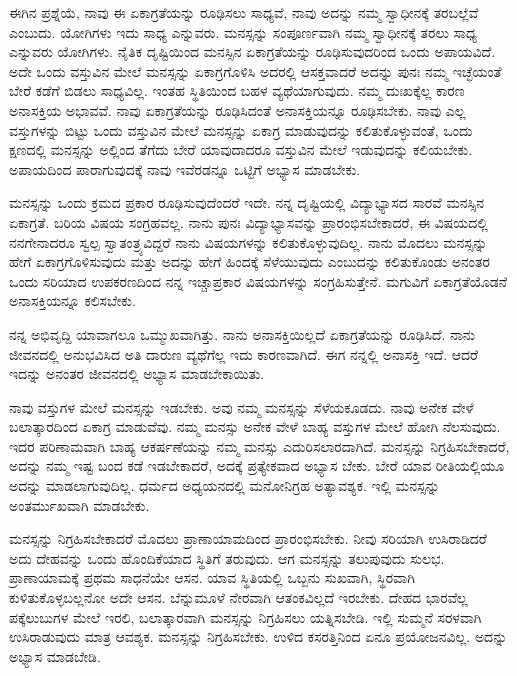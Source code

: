 ಈಗಿನ ಪ್ರಶ್ನೆಯೆ, ನಾವು ಈ ಏಕಾಗ್ರತೆಯನ್ನು ರೂಢಿಸಲು ಸಾಧ್ಯವೆ, ನಾವು ಅದನ್ನು ನಮ್ಮ ಸ್ವಾಧೀನಕ್ಕೆ ತರಬಲ್ಲೆವೆ ಎಂಬುದು. ಯೋಗಿಗಳು ಇದು ಸಾಧ್ಯ ಎನ್ನುವರು. ಮನಸ್ಸನ್ನು ಸಂಪೂರ್ಣವಾಗಿ ನಮ್ಮ ಸ್ವಾಧೀನಕ್ಕೆ ತರಲು ಸಾಧ್ಯ ಎನ್ನುವರು ಯೋಗಿಗಳು. ನೈತಿಕ ದೃಷ್ಟಿಯಿಂದ ಮನಸ್ಸಿನ ಏಕಾಗ್ರತೆಯನ್ನು ರೂಢಿಸುವುದರಿಂದ ಒಂದು ಅಪಾಯವಿದೆ. ಅದೇ ಒಂದು ವಸ್ತುವಿನ ಮೇಲೆ ಮನಸ್ಸನ್ನು ಏಕಾಗ್ರಗೊಳಿಸಿ ಅದರಲ್ಲಿ ಆಸಕ್ತವಾದರೆ ಅದನ್ನು ಪುನಃ ನಮ್ಮ ಇಚ್ಛೆಯಂತೆ ಬೇರೆ ಕಡೆಗೆ ಬಿಡಲು ಸಾಧ್ಯವಿಲ್ಲ. ಇಂತಹ ಸ್ಥಿತಿಯಿಂದ ಬಹಳ ವ್ಯಥೆಯಾಗುವುದು. ನಮ್ಮ ದುಃಖಕ್ಕೆಲ್ಲ ಕಾರಣ ಅನಾಸಕ್ತಿಯ ಅಭಾವವೆ. ನಾವು ಏಕಾಗ್ರತೆಯನ್ನು ರೂಢಿಸಿದಂತೆ ಅನಾಸಕ್ತಿಯನ್ನೂ ರೂಢಿಸಬೇಕು. ನಾವು ಎಲ್ಲ ವಸ್ತುಗಳನ್ನು ಬಿಟ್ಟು ಒಂದು ವಸ್ತುವಿನ ಮೇಲೆ ಮನಸ್ಸನ್ನು ಏಕಾಗ್ರ ಮಾಡುವುದನ್ನು ಕಲಿತುಕೊಳ್ಳುವಂತೆ, ಒಂದು ಕ್ಷಣದಲ್ಲಿ ಮನಸ್ಸನ್ನು ಅಲ್ಲಿಂದ ತೆಗೆದು ಬೇರೆ ಯಾವುದಾದರೂ ವಸ್ತುವಿನ ಮೇಲೆ ಇಡುವುದನ್ನು ಕಲಿಯಬೇಕು. ಅಪಾಯದಿಂದ ಪಾರಾಗುವುದಕ್ಕೆ ನಾವು ಇವೆರಡನ್ನೂ ಒಟ್ಟಿಗೆ ಅಭ್ಯಾಸ ಮಾಡಬೇಕು.

ಮನಸ್ಸನ್ನು ಒಂದು ಕ್ರಮದ ಪ್ರಕಾರ ರೂಢಿಸುವುದೆಂದರೆ ಇದೇ. ನನ್ನ ದೃಷ್ಟಿಯಲ್ಲಿ ವಿದ್ಯಾಭ್ಯಾಸದ ಸಾರವೆ ಮನಸ್ಸಿನ ಏಕಾಗ್ರತೆ. ಬರಿಯ ವಿಷಯ ಸಂಗ್ರಹವಲ್ಲ. ನಾನು ಪುನಃ ವಿದ್ಯಾಭ್ಯಾಸವನ್ನು ಪ್ರಾರಂಭಿಸಬೇಕಾದರೆ, ಈ ವಿಷಯದಲ್ಲಿ ನನಗೇನಾದರೂ ಸ್ವಲ್ಪ ಸ್ವಾತಂತ್ರ್ಯವಿದ್ದರೆ ನಾನು ವಿಷಯಗಳನ್ನು ಕಲಿತುಕೊಳ್ಳುವುದಿಲ್ಲ. ನಾನು ಮೊದಲು ಮನಸ್ಸನ್ನು ಹೇಗೆ ಏಕಾಗ್ರಗೊಳಿಸುವುದು ಮತ್ತು ಅದನ್ನು ಹೇಗೆ ಹಿಂದಕ್ಕೆ ಸೆಳೆಯುವುದು ಎಂಬುದನ್ನು ಕಲಿತುಕೊಂಡು ಅನಂತರ ಒಂದು ಸರಿಯಾದ ಉಪಕರಣದಿಂದ ನನ್ನ ಇಚ್ಚಾಪ್ರಕಾರ ವಿಷಯಗಳನ್ನು ಸಂಗ್ರಹಿಸುತ್ತೇನೆ. ಮಗುವಿಗೆ ಏಕಾಗ್ರತೆಯೊಡನೆ ಅನಾಸಕ್ತಿಯನ್ನೂ ಕಲಿಸಬೇಕು.

ನನ್ನ ಅಭಿವೃದ್ದಿ ಯಾವಾಗಲೂ ಒಮ್ಮುಖವಾಗಿತ್ತು. ನಾನು ಅನಾಸಕ್ತಿಯಿಲ್ಲದೆ ಏಕಾಗ್ರತೆಯನ್ನು ರೂಢಿಸಿದೆ. ನಾನು ಜೀವನದಲ್ಲಿ ಅನುಭವಿಸಿದ ಅತಿ ದಾರುಣ ವ್ಯಥೆಗೆಲ್ಲ ಇದು ಕಾರಣವಾಗಿದೆ. ಈಗ ನನ್ನಲ್ಲಿ ಅನಾಸಕ್ತಿ ಇದೆ. ಆದರೆ ಇದನ್ನು ಅನಂತರ ಜೀವನದಲ್ಲಿ ಅಭ್ಯಾಸ ಮಾಡಬೇಕಾಯಿತು.

ನಾವು ವಸ್ತುಗಳ ಮೇಲೆ ಮನಸ್ಸನ್ನು ಇಡಬೇಕು. ಅವು ನಮ್ಮ ಮನಸ್ಸನ್ನು ಸೆಳೆಯಕೂಡದು. ನಾವು ಅನೇಕ ವೇಳೆ ಬಲಾತ್ಕಾರದಿಂದ ಏಕಾಗ್ರ ಮಾಡುವೆವು. ನಮ್ಮ ಮನಸ್ಸು ಅನೇಕ ವೇಳೆ ಬಾಹ್ಯ ವಸ್ತುಗಳ ಮೇಲೆ ಹೋಗಿ ನೆಲಸುವುದು. ಇದರ ಪರಿಣಾಮವಾಗಿ ಬಾಹ್ಯ ಆಕರ್ಷಣೆಯನ್ನು ನಮ್ಮ ಮನಸ್ಸು ಎದುರಿಸಲಾರದಾಗಿದೆ. ಮನಸ್ಸನ್ನು ನಿಗ್ರಹಿಸಬೇಕಾದರೆ, ಅದನ್ನು ನಮ್ಮ ಇಷ್ಟ ಬಂದ ಕಡೆ ಇಡಬೇಕಾದರೆ, ಅದಕ್ಕೆ ಪ್ರತ್ಯೇಕವಾದ ಅಭ್ಯಾಸ ಬೇಕು. ಬೇರೆ ಯಾವ ರೀತಿಯಲ್ಲಿಯೂ ಅದನ್ನು ಮಾಡಲಾಗುವುದಿಲ್ಲ. ಧರ್ಮದ ಅಧ್ಯಯನದಲ್ಲಿ ಮನೋನಿಗ್ರಹ ಅತ್ಯಾವಶ್ಯಕ. ಇಲ್ಲಿ ಮನಸ್ಸನ್ನು ಅಂತರ್ಮುಖವಾಗಿ ಮಾಡಬೇಕು.

ಮನಸ್ಸನ್ನು ನಿಗ್ರಹಿಸಬೇಕಾದರೆ ಮೊದಲು ಪ್ರಾಣಾಯಾಮದಿಂದ ಪ್ರಾರಂಭಿಸಬೇಕು. ನೀವು ಸರಿಯಾಗಿ ಉಸಿರಾಡಿದರೆ ಅದು ದೇಹವನ್ನು ಒಂದು ಹೊಂದಿಕೆಯಾದ ಸ್ಥಿತಿಗೆ ತರುವುದು. ಆಗ ಮನಸ್ಸನ್ನು ತಲುಪುವುದು ಸುಲಭ. ಪ್ರಾಣಾಯಾಮಕ್ಕೆ ಪ್ರಥಮ ಸಾಧನೆಯೇ ಆಸನ. ಯಾವ ಸ್ಥಿತಿಯಲ್ಲಿ ಒಬ್ಬನು ಸುಖವಾಗಿ, ಸ್ಥಿರವಾಗಿ ಕುಳಿತುಕೊಳ್ಳಬಲ್ಲನೋ ಅದೇ ಆಸನ. ಬೆನ್ನುಮೂಳೆ ನೇರವಾಗಿ ಆತಂಕವಿಲ್ಲದೆ ಇರಬೇಕು. ದೇಹದ ಭಾರವೆಲ್ಲ ಪಕ್ಕೆಲುಬುಗಳ ಮೇಲೆ ಇರಲಿ, ಬಲಾತ್ಕಾರವಾಗಿ ಮನಸ್ಸನ್ನು ನಿಗ್ರಹಿಸಲು ಯತ್ನಿಸಬೇಡಿ. ಇಲ್ಲಿ ಸುಮ್ಮನೆ ಸರಳವಾಗಿ ಉಸಿರಾಡುವುದು ಮಾತ್ರ ಆವಶ್ಯಕ. ಮನಸ್ಸನ್ನು ನಿಗ್ರಹಿಸಬೇಕು. ಉಳಿದ ಕಸರತ್ತಿನಿಂದ ಏನೂ ಪ್ರಯೋಜನವಿಲ್ಲ. ಅದನ್ನು ಅಭ್ಯಾಸ ಮಾಡಬೇಡಿ.

